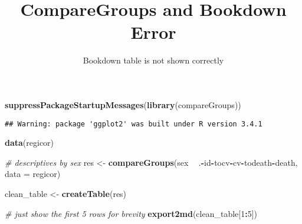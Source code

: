 \documentclass[]{article}
\title{CompareGroups and Bookdown Error}
\subtitle{Bookdown table is not shown correctly}
\author{}
\date{}
\newenvironment{Shaded}{\begin{snugshade}}{\end{snugshade}}
\newcommand{\KeywordTok}[1]{\textcolor[rgb]{0.13,0.29,0.53}{\textbf{#1}}}
\newcommand{\DataTypeTok}[1]{\textcolor[rgb]{0.13,0.29,0.53}{#1}}
\newcommand{\DecValTok}[1]{\textcolor[rgb]{0.00,0.00,0.81}{#1}}
\newcommand{\StringTok}[1]{\textcolor[rgb]{0.31,0.60,0.02}{#1}}
\newcommand{\CommentTok}[1]{\textcolor[rgb]{0.56,0.35,0.01}{\textit{#1}}}
\newcommand{\OperatorTok}[1]{\textcolor[rgb]{0.81,0.36,0.00}{\textbf{#1}}}
\newcommand{\NormalTok}[1]{#1}
\begin{document}
\maketitle

{
\setcounter{tocdepth}{2}
\tableofcontents
}
\begin{Shaded}
\begin{Highlighting}[]
\KeywordTok{suppressPackageStartupMessages}\NormalTok{(}\KeywordTok{library}\NormalTok{(compareGroups))}
\end{Highlighting}
\end{Shaded}

\begin{verbatim}
## Warning: package 'ggplot2' was built under R version 3.4.1
\end{verbatim}

\begin{Shaded}
\begin{Highlighting}[]
\KeywordTok{data}\NormalTok{(regicor)}

\CommentTok{# descriptives by sex}
\NormalTok{res <-}\StringTok{ }\KeywordTok{compareGroups}\NormalTok{(sex }\OperatorTok{~}\StringTok{ }\NormalTok{.}\OperatorTok{-}\NormalTok{id}\OperatorTok{-}\NormalTok{tocv}\OperatorTok{-}\NormalTok{cv}\OperatorTok{-}\NormalTok{todeath}\OperatorTok{-}\NormalTok{death, }\DataTypeTok{data =}\NormalTok{ regicor)}

\NormalTok{clean_table <-}\StringTok{ }\KeywordTok{createTable}\NormalTok{(res)}
\end{Highlighting}
\end{Shaded}

\begin{Shaded}
\begin{Highlighting}[]
\CommentTok{# just show the first 5 rows for brevity}
\KeywordTok{export2md}\NormalTok{(clean_table[}\DecValTok{1}\OperatorTok{:}\DecValTok{5}\NormalTok{])}
\end{Highlighting}
\end{Shaded}
\end{document}
